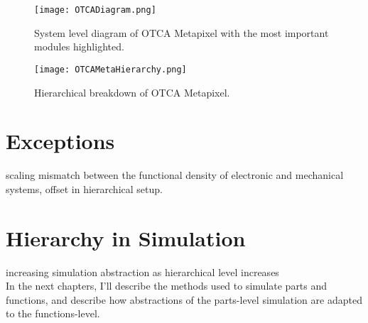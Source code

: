 {\begin{figure}
  \texttt{[image: OTCADiagram.png]}
  \caption{System level diagram of OTCA Metapixel with the most important modules highlighted.}
  \label{fig:OTCADiagram}
\end{figure}

\begin{sidewaysfigure}
  \texttt{[image: OTCAMetaHierarchy.png]}
  \caption{Hierarchical breakdown of OTCA Metapixel.}
  \label{fig:OTCAMetaHierarchy}
\end{sidewaysfigure}

\section{Exceptions}

scaling mismatch between the functional density of electronic and mechanical systems, offset in hierarchical setup.

\section{Hierarchy in Simulation}

increasing simulation abstraction as hierarchical level increases\\

In the next chapters, I'll describe the methods used to simulate parts and functions, and describe how abstractions of the parts-level simulation are adapted to the functions-level.



}
